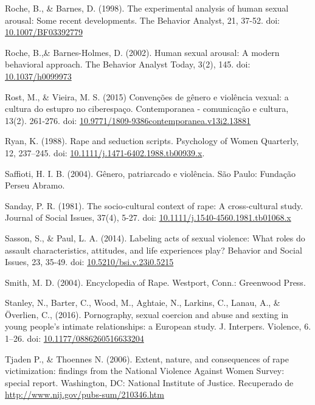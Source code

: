 \hangindent=25pt
\noindent Roche, B., \& Barnes, D. (1998). The experimental analysis of human sexual arousal: Some recent developments. The Behavior Analyst, 21, 37-52. doi: \url{10.1007/BF03392779}

\hangindent=25pt
\noindent Roche, B.,\& Barnes-Holmes, D. (2002). Human sexual arousal: A modern behavioral approach. The Behavior Analyst Today, 3(2), 145. doi: \url{10.1037/h0099973}

\hangindent=25pt
\noindent Rost, M., \& Vieira, M. S. (2015) Convenções de gênero e violência vexual: a cultura do estupro no ciberespaço. Contemporanea - comunicação e cultura, 13(2). 261-276. doi: \url{10.9771/1809-9386contemporanea.v13i2.13881}

\hangindent=25pt
\noindent Ryan, K. (1988). Rape and seduction scripts. Psychology of Women Quarterly, 12, 237–245. doi: \url{10.1111/j.1471-6402.1988.tb00939.x}.

\hangindent=25pt
\noindent Saffioti, H. I. B. (2004). Gênero, patriarcado e violência. São Paulo: Fundação Perseu Abramo.

\hangindent=25pt
\noindent Sanday, P. R. (1981). The socio-cultural context of rape: A cross-cultural study. Journal of Social Issues, 37(4), 5-27. doi: \url{10.1111/j.1540-4560.1981.tb01068.x}

\hangindent=25pt
\noindent Sasson, S., \& Paul, L. A. (2014). Labeling acts of sexual violence: What roles do assault characteristics, attitudes, and life experiences play? Behavior and Social Issues, 23, 35-49. doi: \url{10.5210/bsi.v.23i0.5215}

\hangindent=25pt
\noindent Smith, M. D. (2004). Encyclopedia of Rape. Westport, Conn.: Greenwood Press.

\hangindent=25pt
\noindent Stanley, N., Barter, C., Wood, M., Aghtaie, N., Larkins, C., Lanau, A., \& Överlien, C., (2016). Pornography, sexual coercion and abuse and sexting in young people’s intimate relationships: a European study. J. Interpers. Violence, 6. 1–26. doi: \url{10.1177/0886260516633204}

\hangindent=25pt
\noindent Tjaden P., \& Thoennes N. (2006). Extent, nature, and consequences of rape victimization: findings from the National Violence Against Women Survey: special report. Washington, DC: National Institute of Justice. Recuperado de \url{http://www.nij.gov/pubs-sum/210346.htm}

